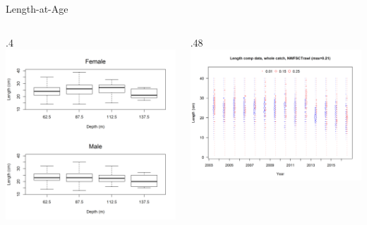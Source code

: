 \documentclass[ignorenonframetext,]{beamer}
\def\begincols{\begin{columns}}
\def\begincol{\begin{column}}
\def\endcol{\end{column}}
\def\endcols{\end{columns}}
\begin{document}
\begin{frame}{Length-at-Age}

\begincols
 \begincol{.4\textwidth}
\includegraphics{Figures/NWFSCtrawl_lengthdepth.png} \endcol
\begincol{.48\textwidth}
\includegraphics{r4ss/plots_mod1/comp_lendat_bubflt8mkt0.png} \endcol
\endcols

\end{frame}
\end{document}
